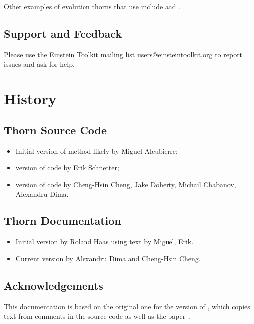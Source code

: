Other examples of  evolution thorns that use 
include \cite{SpacetimeX_NewRadX_CanudaX_BSSNMoL}
and \cite{SpacetimeX_NewRadX_Z4c}.


\subsection{Support and Feedback}
Please use the Einstein Toolkit mailing list
\url{users@einsteintoolkit.org} to report issues and ask for help.

\section{History}

\subsection{Thorn Source Code}
\begin{itemize}
\item Initial version of method likely by Miguel Alcubierre;
\item {} version of code by Erik Schnetter;
\item {} version of code by Cheng-Hsin Cheng, Jake Doherty,
  Michail Chabanov, Alexandru Dima.
\end{itemize}

\subsection{Thorn Documentation}
\begin{itemize}
\item Initial version by Roland Haas using text by Miguel, Erik.
\item Current version by Alexandru Dima and Cheng-Hsin Cheng.
\end{itemize}

\subsection{Acknowledgements}
This documentation is based on the original one for the  version
of , which copies text from comments in the source code as well
as the paper~\cite{SpacetimeX_NewRadX_Alcubierre:2002kk}.

